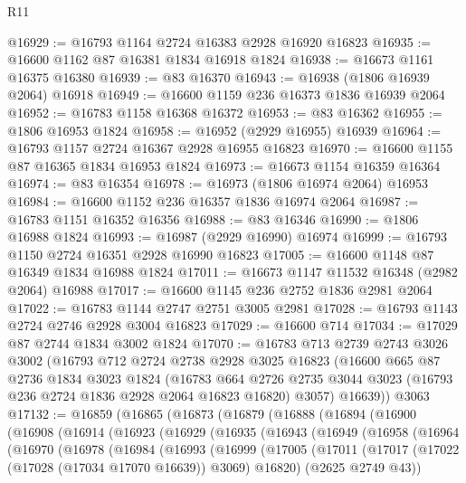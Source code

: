 \begin{lexlean}{R11}
\begin{coremodule}
@16929 := @16793 @1164 @2724 @16383 @2928 @16920 @16823
@16935 := @16600 @1162 @87 @16381 @1834 @16918 @1824
@16938 := @16673 @1161 @16375 @16380
@16939 := @83 @16370
@16943 := @16938 (@1806 @16939 @2064) @16918
@16949 := @16600 @1159 @236 @16373 @1836 @16939 @2064
@16952 := @16783 @1158 @16368 @16372
@16953 := @83 @16362
@16955 := @1806 @16953 @1824
@16958 := @16952 (@2929 @16955) @16939
@16964 := @16793 @1157 @2724 @16367 @2928 @16955 @16823
@16970 := @16600 @1155 @87 @16365 @1834 @16953 @1824
@16973 := @16673 @1154 @16359 @16364
@16974 := @83 @16354
@16978 := @16973 (@1806 @16974 @2064) @16953
@16984 := @16600 @1152 @236 @16357 @1836 @16974 @2064
@16987 := @16783 @1151 @16352 @16356
@16988 := @83 @16346
@16990 := @1806 @16988 @1824
@16993 := @16987 (@2929 @16990) @16974
@16999 := @16793 @1150 @2724 @16351 @2928 @16990 @16823
@17005 := @16600 @1148 @87 @16349 @1834 @16988 @1824
@17011 := @16673 @1147 @11532 @16348 (@2982 @2064) @16988
@17017 := @16600 @1145 @236 @2752 @1836 @2981 @2064
@17022 := @16783 @1144 @2747 @2751 @3005 @2981
@17028 := @16793 @1143 @2724 @2746 @2928 @3004 @16823
@17029 := @16600 @714
@17034 := @17029 @87 @2744 @1834 @3002 @1824
@17070 := @16783
    @713
    @2739
    @2743
    @3026
    @3002
    (@16793
      @712
      @2724
      @2738
      @2928
      @3025
      @16823
      (@16600
        @665
        @87
        @2736
        @1834
        @3023
        @1824
        (@16783
          @664
          @2726
          @2735
          @3044
          @3023
          (@16793 @236 @2724 @1836 @2928 @2064 @16823 @16820)
          @3057)
        @16639))
    @3063
@17132 := @16859
    (@16865
      (@16873
        (@16879
          (@16888
            (@16894
              (@16900
                (@16908
                  (@16914
                    (@16923
                      (@16929
                        (@16935
                          (@16943
                            (@16949
                              (@16958
                                (@16964
                                  (@16970
                                    (@16978
                                      (@16984
                                        (@16993
                                          (@16999
                                            (@17005
                                              (@17011
                                                (@17017
                                                  (@17022 (@17028 (@17034 @17070 @16639)) @3069)
                                                  @16820)
                                                (@2625 @2749 @43))

\end{coremodule}
\end{lexlean}
